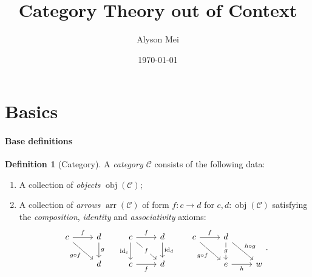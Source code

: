 \documentclass[12pt]{article}
\title{Category Theory out of Context}
\author{Alyson Mei}
\date{\today}
\theoremstyle{definition}
\newtheorem{definition}[theorem]{Definition}
\newcommand{\mc}{\mathcal}
\newcommand{\id}{\mathrm{id}}
\newcommand{\obj}{\operatorname{obj}}
\newcommand{\arr}{\operatorname{arr}}
\begin{document}
\maketitle



\section{Basics}

\paragraph{Base definitions}

\begin{definition}[Category] A \emph{category $\mc{C}$} consists of the following data:
\begin{enumerate}
    \item A collection of \emph{objects} $\obj(\mc{C})$;
    \item A collection of \emph{arrows} $\arr(\mc{C})$ of form $f: c \to d$ for $c, d: \obj(\mc{C})$ satisfying the \emph{composition}, \emph{identity} and \emph{associativity} axioms:
    \[\begin{tikzcd}
        c & d & c & d & c & d & \\
        & d & c & d && e & w
        \arrow["f", from=1-1, to=1-2]
        \arrow["{g \circ f}"', from=1-1, to=2-2]
        \arrow["g", from=1-2, to=2-2]
        \arrow["f", from=1-3, to=1-4]
        \arrow["{\id_c}"', from=1-3, to=2-3]
        \arrow["f"{description}, from=1-3, to=2-4]
        \arrow["{\id_d}", from=1-4, to=2-4]
        \arrow["f", from=1-5, to=1-6]
        \arrow["{g \circ f}"', from=1-5, to=2-6]
        \arrow["g"{description}, from=1-6, to=2-6]
        \arrow["{h \circ g}", from=1-6, to=2-7]
        \arrow["f"', from=2-3, to=2-4]
        \arrow["h"', from=2-6, to=2-7]
    \end{tikzcd}\text{.}\] 
\end{enumerate}
\end{definition}
\end{document}
